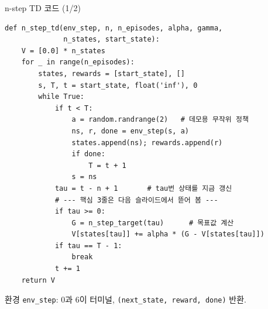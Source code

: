 \begin{frame}[fragile]{n-step TD 코드 (1/2)}
  \begin{lstlisting}[basicstyle=\ttfamily\footnotesize]
def n_step_td(env_step, n, n_episodes, alpha, gamma,
              n_states, start_state):
    V = [0.0] * n_states
    for _ in range(n_episodes):
        states, rewards = [start_state], []
        s, T, t = start_state, float('inf'), 0
        while True:
            if t < T:
                a = random.randrange(2)   # 데모용 무작위 정책
                ns, r, done = env_step(s, a)
                states.append(ns); rewards.append(r)
                if done:
                    T = t + 1
                s = ns
            tau = t - n + 1       # tau번 상태를 지금 갱신
            # --- 핵심 3줄은 다음 슬라이드에서 뜯어 봄 ---
            if tau >= 0:
                G = n_step_target(tau)      # 목표값 계산
                V[states[tau]] += alpha * (G - V[states[tau]])
            if tau == T - 1:
                break
            t += 1
    return V
  \end{lstlisting}
  {\footnotesize 환경 \texttt{env\_step}: 0과 6이 터미널,
  \texttt{(next\_state, reward, done)} 반환.}
\end{frame}
